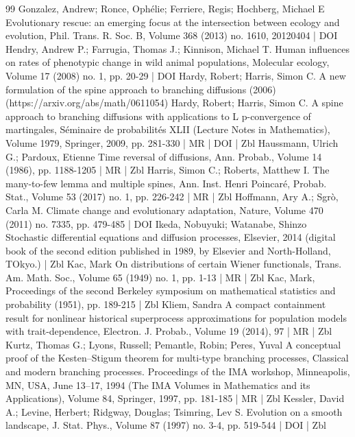 \begin{thebibliography}{99}
Gonzalez, Andrew; Ronce, Ophélie; Ferriere, Regis; Hochberg, Michael E Evolutionary rescue: an emerging focus at the intersection between ecology and evolution, Phil. Trans. R. Soc. B, Volume 368 (2013) no. 1610, 20120404 | DOI
Hendry, Andrew P.; Farrugia, Thomas J.; Kinnison, Michael T. Human influences on rates of phenotypic change in wild animal populations, Molecular ecology, Volume 17 (2008) no. 1, pp. 20-29 | DOI
Hardy, Robert; Harris, Simon C. A new formulation of the spine approach to branching diffusions (2006) (https://arxiv.org/abs/math/0611054)
Hardy, Robert; Harris, Simon C. A spine approach to branching diffusions with applications to L p-convergence of martingales, Séminaire de probabilités XLII (Lecture Notes in Mathematics), Volume 1979, Springer, 2009, pp. 281-330 | MR | DOI | Zbl
Haussmann, Ulrich G.; Pardoux, Etienne Time reversal of diffusions, Ann. Probab., Volume 14 (1986), pp. 1188-1205 | MR | Zbl
Harris, Simon C.; Roberts, Matthew I. The many-to-few lemma and multiple spines, Ann. Inst. Henri Poincaré, Probab. Stat., Volume 53 (2017) no. 1, pp. 226-242 | MR | Zbl
Hoffmann, Ary A.; Sgrò, Carla M. Climate change and evolutionary adaptation, Nature, Volume 470 (2011) no. 7335, pp. 479-485 | DOI
Ikeda, Nobuyuki; Watanabe, Shinzo Stochastic differential equations and diffusion processes, Elsevier, 2014 (digital book of the second edition published in 1989, by Elsevier and North-Holland, TOkyo.) | Zbl
Kac, Mark On distributions of certain Wiener functionals, Trans. Am. Math. Soc., Volume 65 (1949) no. 1, pp. 1-13 | MR | Zbl
Kac, Mark, Proceedings of the second Berkeley symposium on mathematical statistics and probability (1951), pp. 189-215 | Zbl
Kliem, Sandra A compact containment result for nonlinear historical superprocess approximations for population models with trait-dependence, Electron. J. Probab., Volume 19 (2014), 97 | MR | Zbl
Kurtz, Thomas G.; Lyons, Russell; Pemantle, Robin; Peres, Yuval A conceptual proof of the Kesten–Stigum theorem for multi-type branching processes, Classical and modern branching processes. Proceedings of the IMA workshop, Minneapolis, MN, USA, June 13–17, 1994 (The IMA Volumes in Mathematics and its Applications), Volume 84, Springer, 1997, pp. 181-185 | MR | Zbl
Kessler, David A.; Levine, Herbert; Ridgway, Douglas; Tsimring, Lev S. Evolution on a smooth landscape, J. Stat. Phys., Volume 87 (1997) no. 3-4, pp. 519-544 | DOI | Zbl

\end{thebibliography}
